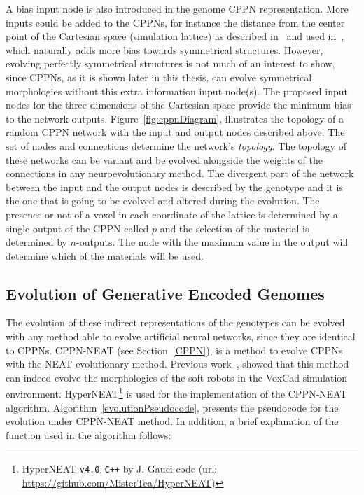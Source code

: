 A bias input node is also introduced in the genome CPPN representation. More inputs could be added to the CPPNs, for instance the distance from the center point of the Cartesian space (simulation lattice) as described in~\citep{stanley2007compositional} and used in~\citep{cheney2013unshackling}, which naturally adds more bias towards symmetrical structures. However, evolving perfectly symmetrical structures is not much of an interest to show, since CPPNs, as it is shown later in this thesis, can evolve symmetrical morphologies without this extra information input node(s). The proposed input nodes for the three dimensions of the Cartesian space provide the minimum bias to the network outputs. Figure~\ref{fig:cppnDiagram}, illustrates the topology of a random CPPN network with the input and output nodes described above. The set of nodes and connections determine the network's \emph{topology}. The topology of these networks can be variant and be evolved alongside the weights of the connections in any neuroevolutionary method. The divergent part of the network between the input and the output nodes is described by the genotype and it is the one that is going to be evolved and altered during the evolution. The presence or not of a voxel in each coordinate of the lattice is determined by a single output of the CPPN called $p$ and the selection of the material is determined by $n$-outputs. The node with the maximum value in the output will determine which of the materials will be used.

\subsection{Evolution of Generative Encoded Genomes}

The evolution of these indirect representations of the genotypes can be evolved with any method able to evolve artificial neural networks, since they are identical to CPPNs. CPPN-NEAT (see Section~\ref{CPPN}), is a method to evolve CPPNs with the NEAT evolutionary method. Previous work~\citep{cheney2013unshackling}, showed that this method can indeed evolve the morphologies of the soft robots in the VoxCad simulation environment. HyperNEAT\footnote{HyperNEAT \texttt{v4.0 C++} by J. Gauci code (url: \url{https://github.com/MisterTea/HyperNEAT})} is used for the implementation of the CPPN-NEAT algorithm. Algorithm~\ref{evolutionPseudocode}, presents the pseudocode for the evolution under CPPN-NEAT method. In addition, a brief explanation of the function used in the algorithm follows:


